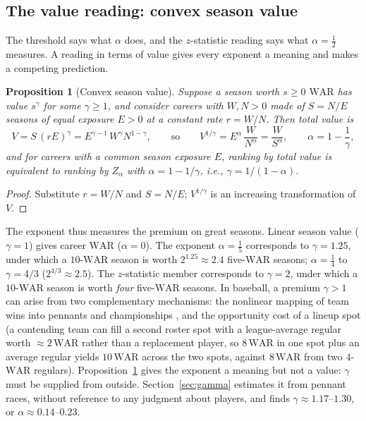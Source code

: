 \documentclass[11pt,letterpaper]{article}
\theoremstyle{plain}
\newtheorem{proposition}{Proposition}
\theoremstyle{definition}
\theoremstyle{remark}
\newcommand{\WAR}{\mathrm{WAR}}
\begin{document}
\subsection{The value reading: convex season value}
\label{sec:value}

The threshold says what $\alpha$ does, and the $z$-statistic reading says what $\alpha = \tfrac12$ measures. A reading in terms of value gives every exponent a meaning and makes a competing prediction.

\begin{proposition}[Convex season value]
\label{prop:gamma}
Suppose a season worth $s \ge 0$ $\WAR$ has value $s^{\gamma}$ for some $\gamma \ge 1$, and consider careers with $W, N > 0$ made of $S = N/E$ seasons of equal exposure $E > 0$ at a constant rate $r = W/N$. Then total value is
\begin{equation}
    V = S\,(rE)^{\gamma} = E^{\gamma - 1}\, W^{\gamma} N^{1-\gamma},
    \qquad\text{so}\qquad
    V^{1/\gamma} = E^{\alpha}\,\frac{W}{N^{\alpha}} = \frac{W}{S^{\alpha}},
    \qquad \alpha = 1 - \frac{1}{\gamma},
\end{equation}
and for careers with a common season exposure $E$, ranking by total value is equivalent to ranking by $Z_\alpha$ with $\alpha = 1 - 1/\gamma$, i.e., $\gamma = 1/(1-\alpha)$.
\end{proposition}

\begin{proof}
Substitute $r = W/N$ and $S = N/E$; $V^{1/\gamma}$ is an increasing transformation of $V$.
\end{proof}

The exponent thus measures the premium on great seasons. Linear season value ($\gamma = 1$) gives career $\WAR$ ($\alpha = 0$). The exponent $\alpha = \tfrac15$ corresponds to $\gamma = 1.25$, under which a $10$-$\WAR$ season is worth $2^{1.25} \approx 2.4$ five-$\WAR$ seasons; $\alpha = \tfrac14$ to $\gamma = 4/3$ ($2^{4/3} \approx 2.5$). The $z$-statistic member corresponds to $\gamma = 2$, under which a $10$-$\WAR$ season is worth \emph{four} five-$\WAR$ seasons. In baseball, a premium $\gamma > 1$ can arise from two complementary mechanisms: the nonlinear mapping of team wins into pennants and championships \cite{james1994,gassko2007,jaffe2017si}, and the opportunity cost of a lineup spot (a contending team can fill a second roster spot with a league-average regular worth $\approx 2\,\WAR$ rather than a replacement player, so $8\,\WAR$ in one spot plus an average regular yields $10\,\WAR$ across the two spots, against $8\,\WAR$ from two $4$-$\WAR$ regulars). Proposition~\ref{prop:gamma} gives the exponent a meaning but not a value: $\gamma$ must be supplied from outside. Section~\ref{sec:gamma} estimates it from pennant races, without reference to any judgment about players, and finds $\gamma \approx 1.17$--$1.30$, or $\alpha \approx 0.14$--$0.23$.
\end{document}
